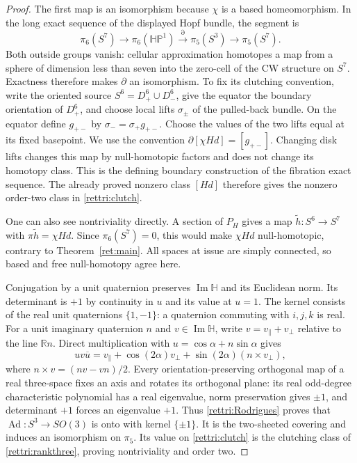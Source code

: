 \documentclass[11pt]{article}
\theoremstyle{definition}
\begin{document}
\begin{proof}
The first map is an isomorphism because $\chi$ is a based
homeomorphism. In the long exact sequence of the displayed Hopf
bundle, the segment is
\[
 \pi_6(S^7)\longrightarrow\pi_6(\mathbb H\mathbb P^1)
 \xrightarrow{\partial}\pi_5(S^3)\longrightarrow\pi_5(S^7).
\]
Both outside groups vanish: cellular approximation homotopes a map
from a sphere of dimension less than seven into the zero-cell of the
CW structure on $S^7$. Exactness therefore makes $\partial$ an
isomorphism. To fix its clutching convention, write the oriented
source $S^6=D^6_+\cup D^6_-$, give the equator the boundary orientation
of $D^6_+$, and choose local lifts $\sigma_\pm$ of the pulled-back
bundle. On the equator define $g_{+-}$ by
$\sigma_- = \sigma_+ g_{+-}$. Choose the values of the two lifts
equal at its fixed basepoint. We use the convention
$\partial[\chi H d]=[g_{+-}]$. Changing disk lifts changes this map
by null-homotopic factors and does not change its homotopy class.
This is the defining boundary construction of the fibration exact
sequence. The already proved nonzero class $[H d]$ therefore gives
the nonzero order-two class in \eqref{rettri:clutch}.

One can also see nontriviality directly. A section of $P_H$ gives a
map $\widetilde h:S^6\to S^7$ with
$\pi\widetilde h=\chi H d$. Since $\pi_6(S^7)=0$, this would make
$\chi H d$ null-homotopic, contrary to Theorem~\ref{ret:main}.
All spaces at issue are simply connected, so based and free
null-homotopy agree here.

Conjugation by a unit quaternion preserves $\operatorname{Im}\mathbb H$
and its Euclidean norm. Its determinant is $+1$ by continuity in
$u$ and its value at $u=1$. The kernel consists of the real unit
quaternions $\{1,-1\}$: a quaternion commuting with $i,j,k$ is real.
For a unit imaginary quaternion $n$ and $v\in\operatorname{Im}\mathbb H$,
write $v=v_\parallel+v_\perp$ relative to the line $\mathbb R n$.
Direct multiplication with $u=\cos\alpha+n\sin\alpha$ gives
\begin{equation}
 u v\overline u=v_\parallel+\cos(2\alpha)v_\perp
                     +\sin(2\alpha)(n\times v_\perp),
 \label{rettri:Rodrigues}
\end{equation}
where $n\times v=(nv-vn)/2$. Every orientation-preserving
orthogonal map of a real three-space fixes an axis and rotates its
orthogonal plane: its real odd-degree characteristic polynomial has
a real eigenvalue, norm preservation gives $\pm1$, and determinant
$+1$ forces an eigenvalue $+1$. Thus
\eqref{rettri:Rodrigues} proves that
$\operatorname{Ad}:S^3\to SO(3)$ is onto with kernel $\{\pm1\}$.
It is the two-sheeted covering and induces an isomorphism on
$\pi_5$. Its value on \eqref{rettri:clutch} is the clutching
class of \eqref{rettri:rankthree}, proving nontriviality and
order two.


\end{proof}
\end{document}
